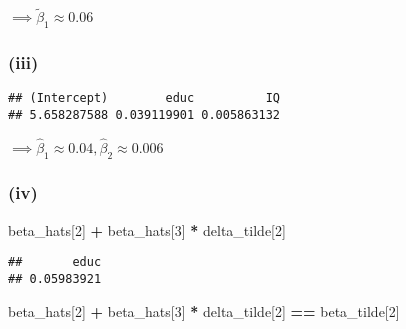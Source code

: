 \documentclass[
]{article}
\newenvironment{Shaded}{\begin{snugshade}}{\end{snugshade}}
\newcommand{\DataTypeTok}[1]{\textcolor[rgb]{0.13,0.29,0.53}{#1}}
\newcommand{\DecValTok}[1]{\textcolor[rgb]{0.00,0.00,0.81}{#1}}
\newcommand{\KeywordTok}[1]{\textcolor[rgb]{0.13,0.29,0.53}{\textbf{#1}}}
\newcommand{\NormalTok}[1]{#1}
\newcommand{\OperatorTok}[1]{\textcolor[rgb]{0.81,0.36,0.00}{\textbf{#1}}}
\newcommand{\StringTok}[1]{\textcolor[rgb]{0.31,0.60,0.02}{#1}}
\begin{document}
\(\implies \tilde\beta_1 \approx 0.06\)\\
\break

\hypertarget{iii}{%
\subsubsection{(iii)}\label{iii}}

\begin{Shaded}
\end{Shaded}

\begin{verbatim}
## (Intercept)        educ          IQ 
## 5.658287588 0.039119901 0.005863132
\end{verbatim}

\(\implies \hat\beta_1 \approx 0.04, \hat\beta_2 \approx 0.006\)

\hypertarget{iv}{%
\subsubsection{(iv)}\label{iv}}

\begin{Shaded}
\begin{Highlighting}[]
\NormalTok{beta_hats[}\DecValTok{2}\NormalTok{] }\OperatorTok{+}\StringTok{ }\NormalTok{beta_hats[}\DecValTok{3}\NormalTok{] }\OperatorTok{*}\StringTok{ }\NormalTok{delta_tilde[}\DecValTok{2}\NormalTok{]}
\end{Highlighting}
\end{Shaded}

\begin{verbatim}
##       educ 
## 0.05983921
\end{verbatim}

\begin{Shaded}
\begin{Highlighting}[]
\NormalTok{beta_hats[}\DecValTok{2}\NormalTok{] }\OperatorTok{+}\StringTok{ }\NormalTok{beta_hats[}\DecValTok{3}\NormalTok{] }\OperatorTok{*}\StringTok{ }\NormalTok{delta_tilde[}\DecValTok{2}\NormalTok{] }\OperatorTok{==}\StringTok{ }\NormalTok{beta_tilde[}\DecValTok{2}\NormalTok{]}
\end{Highlighting}
\end{Shaded}
\end{document}
